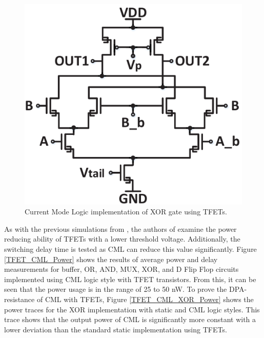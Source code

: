 \documentclass[conference, 12pt]{IEEEtran}
\newcommand{\x}{1}						%
\begin{document}
			\begin{figure}[tbp]
				\centering
				\includegraphics[width=\x\linewidth]{ReportFiles/CML_TFET_XOR.png}
				\caption{Current Mode Logic implementation of XOR gate using TFETs.\cite{b4}}
				\label{CML_TFET_XOR}
			\end{figure}

			As with the previous simulations from \cite{b3}, the authors of \cite{b4} examine the power reducing ability of TFETs with a lower threshold voltage. Additionally, the switching delay time is tested as CML can reduce this value significantly. Figure \ref{TFET_CML_Power} shows the results of average power and delay measurements for buffer, OR, AND, MUX, XOR, and D Flip Flop circuits implemented using CML logic style with TFET transistors. From this, it can be seen that the power usage is in the range of 25 to 50 nW. To prove the DPA-resistance of CML with TFETs, Figure \ref{TFET_CML_XOR_Power} shows the power traces for the XOR implementation with static and CML logic styles. This trace shows that the output power of CML is significantly more constant with a lower deviation than the standard static implementation using TFETs. 
\end{document}
